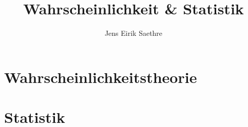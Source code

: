 \documentclass[fontsize=7pt]{scrartcl}
\begin{document}
\author{Jens Eirik Saethre}
\title{Wahrscheinlichkeit \& Statistik}

\begin{multicols*}{3}

\part{Wahrscheinlichkeitstheorie}






\part{Statistik}






\end{multicols*}

\begin{minipage}[t]{0.6\linewidth}
	
\end{minipage}%
\begin{minipage}[t]{0.4\linewidth}
	\blindtext
\end{minipage}
\end{document}
